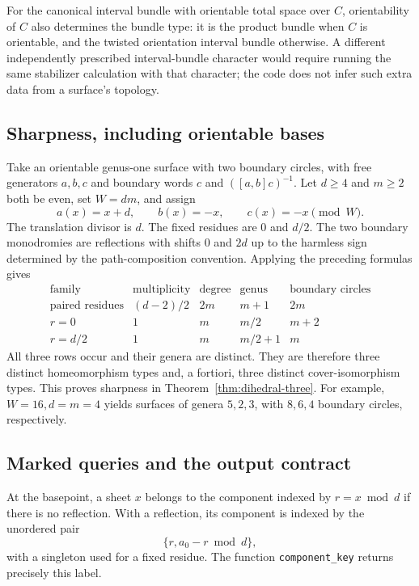 For the canonical interval bundle with orientable total space over
$C$, orientability of $C$ also determines the bundle type: it is the
product bundle when $C$ is orientable, and the twisted orientation
interval bundle otherwise.  A different independently prescribed
interval-bundle character would require running the same stabilizer
calculation with that character; the code does not infer such extra
data from a surface's topology.

\subsection{Sharpness, including orientable bases}

Take an orientable genus-one surface with two boundary circles, with
free generators $a,b,c$ and boundary words $c$ and $([a,b]c)^{-1}$.
Let $d\geq4$ and $m\geq2$ both be even, set $W=dm$, and assign
\[
 a(x)=x+d,\qquad b(x)=-x,\qquad c(x)=-x\pmod W.
\]
The translation divisor is $d$.  The fixed residues are $0$ and $d/2$.
The two boundary monodromies are reflections with shifts $0$ and
$2d$ up to the harmless sign determined by the path-composition
convention.  Applying the preceding formulas gives
\[
\begin{array}{c|c|c|c|c}
\text{family}&\text{multiplicity}&\text{degree}&\text{genus}&
 \text{boundary circles}\\\hline
\text{paired residues}&(d-2)/2&2m&m+1&2m\\
 r=0&1&m&m/2&m+2\\
 r=d/2&1&m&m/2+1&m
\end{array}
\]
All three rows occur and their genera are distinct.  They are therefore
three distinct homeomorphism types and, a fortiori, three distinct
cover-isomorphism types.  This proves sharpness in
Theorem~\ref{thm:dihedral-three}.  For example, $W=16,d=m=4$ yields
surfaces of genera $5,2,3$, with $8,6,4$ boundary circles, respectively.

\subsection{Marked queries and the output contract}

At the basepoint, a sheet $x$ belongs to the component indexed by
$r=x\bmod d$ if there is no reflection.  With a reflection, its
component is indexed by the unordered pair
\[
 \{r,a_0-r\bmod d\},
\]
with a singleton used for a fixed residue.  The function
\texttt{component\_key} returns precisely this label.


